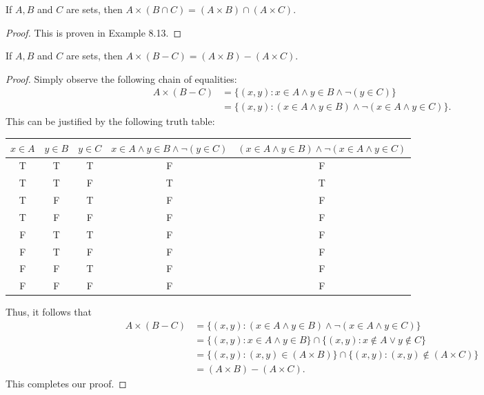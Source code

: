 \documentclass{exam}
\begin{document}
\begin{proposition}{8.17}
    If $A, B$ and $C$ are sets, then $A\times (B\cap C)=(A\times B)\cap (A\times C)$.
\end{proposition}

\begin{proof}
    This is proven in Example 8.13.
\end{proof}

\begin{proposition}{8.18}
    If $A, B$ and $C$ are sets, then $A\times(B-C)=(A\times B)-(A\times C)$.
\end{proposition}

\begin{proof}
    Simply observe the following chain of equalities:
    \begin{align*}
        A\times(B-C)&=\{(x, y): x\in A\land y\in B\land \lnot(y\in C)\}\\
        &=\{(x, y):(x\in A\land y\in B)\land\lnot(x\in A\land y\in C)\}.
    \end{align*}
    This can be justified by the following truth table:
    \begin{center}
        \begin{tabular}{|c|c|c||c||c|}
            \hline
            $x\in A$ & $y\in B$ & $y\in C$ & $x\in A\land y\in B\land \lnot(y\in C)$ & $(x\in A\land y\in B)\land\lnot(x\in A\land y\in C)$\\
            \hline\hline
            T&T&T&F&F\\
            \hline
            T&T&F&T&T\\
            \hline
            T&F&T&F&F\\
            \hline
            T&F&F&F&F\\
            \hline
            F&T&T&F&F\\
            \hline
            F&T&F&F&F\\
            \hline
            F&F&T&F&F\\
            \hline
            F&F&F&F&F\\
            \hline
        \end{tabular}
    \end{center}
    Thus, it follows that
    \begin{align*}
        A\times(B-C)&=\{(x, y):(x\in A\land y\in B)\land\lnot(x\in A\land y\in C)\}\\
        &=\{(x, y):x\in A\land y\in B\}\cap\{(x, y): x\notin A\lor y\notin C\}\\
        &=\{(x, y):(x, y)\in(A\times B)\}\cap\{(x, y): (x,y)\notin(A\times C)\}\\
        &=(A\times B)-(A\times C).
    \end{align*}
    This completes our proof.
\end{proof}
\end{document}
